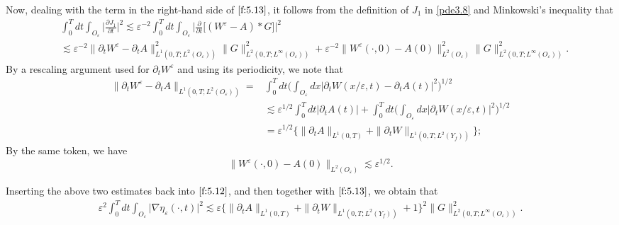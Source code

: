 \documentclass[13pt,CJK]{article}
\theoremstyle{plain}                       %
\theoremstyle{remark}
\numberwithin{equation}{section}
\begin{document}
Now, dealing with the term
in the right-hand side of $\eqref{f:5.13}$,
it follows from the definition of $J_1$ in
\eqref{pde3.8} and Minkowski's inequality  that
\begin{equation}\label{f:5.12}
\begin{aligned}
&\int_{0}^{T}dt\int_{O_{\varepsilon}}
\Big|\frac{\partial J_1}{\partial t}\Big|^2
\lesssim\varepsilon^{-2}
\int_{0}^{T}dt\int_{O_{\varepsilon}}
\Big|\frac{\partial }{\partial t}
\big[(W^{\varepsilon}-A)\ast G\big]\Big|^2\\
&\lesssim\varepsilon^{-2}
\|\partial_tW^{\varepsilon}-\partial_tA\|^2_{L^{1}
(0,T;L^2(O_{\varepsilon}))}
\|G\|^2_{L^{2}(0,T;L^{\infty}(O_{\varepsilon}))}
+\varepsilon^{-2}
\|W^{\varepsilon}(\cdot,0)-A(0)\|^2_{L^{2}
(O_{\varepsilon})}
\|G\|^2_{L^{2}(0,T;L^{\infty}(O_{\varepsilon}))}.
\end{aligned}
\end{equation}
By a rescaling argument used for $\partial_tW^{\varepsilon}$
and using its periodicity,
we note that
\begin{equation*}
\begin{aligned}
\|\partial_tW^{\varepsilon}-\partial_tA\|_{L^{1}
(0,T;L^2(O_{\varepsilon}))}
=&\int_0^{T}dt\bigg(\int_{O_{\varepsilon}}dx
|\partial_tW(x/\varepsilon,t)-\partial_tA(t)|^2\bigg)^{1/2}\\
&\lesssim \varepsilon^{1/2}\int_{0}^Tdt\big|\partial_t A(t)\big|
+\int_{0}^Tdt\bigg(\int_{O_{\varepsilon}}dx
\big|\partial_tW(x/\varepsilon,t)\big|^2\bigg)^{1/2}\\
&=\varepsilon^{1/2}
\Big\{\|\partial_tA\|_{L^1(0,T)}+
\|\partial_tW\|_{L^1(0,T;L^2(Y_f))}\Big\};
\end{aligned}
\end{equation*}
By the same token, we have
\begin{equation*}
\|W^{\varepsilon}(\cdot,0)-A(0)\|_{L^{2}
(O_{\varepsilon})}
\lesssim\varepsilon^{1/2}.
\end{equation*}

Inserting the above two estimates back into $\eqref{f:5.12}$,
and then together with $\eqref{f:5.13}$, we obtain that
\begin{equation*}
\begin{aligned}
\varepsilon^2\int_{0}^{T}dt\int_{O_\varepsilon}
\big|\nabla \eta_{\varepsilon}(\cdot,t)\big|^2
\lesssim \varepsilon
\Big\{\|\partial_tA\|_{L^1(0,T)}
+
\|\partial_tW\|_{L^1(0,T;L^2(Y_f))}+ 1\Big\}^2
\|G\|^2_{L^{2}(0,T;L^{\infty}(O_{\varepsilon}))}.
\end{aligned}
\end{equation*}
\end{document}
